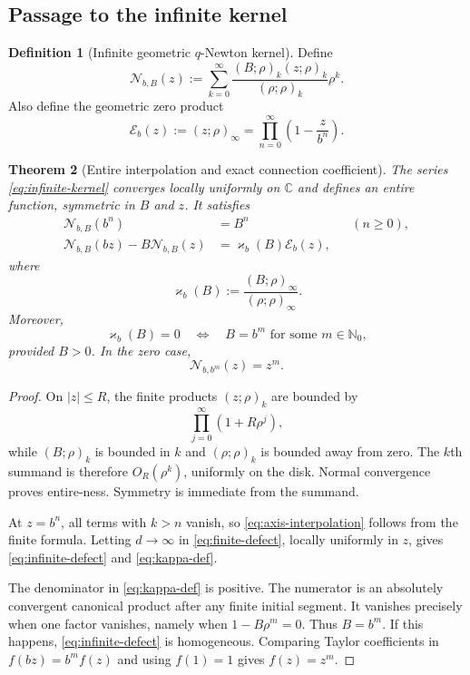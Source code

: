 \documentclass[11pt]{article}
\newtheorem{theorem}{Theorem}[section]
\theoremstyle{definition}
\newtheorem{definition}[theorem]{Definition}
\newcommand{\Nker}{\mathscr{N}}
\newcommand{\Eker}{\mathscr{E}}
\newcommand{\kk}{\varkappa}
\newcommand{\C}{\mathbb{C}}
\newcommand{\N}{\mathbb{N}}
\newcommand{\qpf}[3]{\left(#1;#2\right)_{#3}}
\newcommand{\qpi}[2]{\left(#1;#2\right)_{\!\infty}}
\begin{document}
\subsection{Passage to the infinite kernel}

\begin{definition}[Infinite geometric $q$-Newton kernel]\label{def:infinite-kernel}
Define
\begin{equation}\label{eq:infinite-kernel}
 \Nker_{b,B}(z)
 :=\sum_{k=0}^{\infty}
 \frac{\qpf{B}{\rho}{k}\qpf{z}{\rho}{k}}
      {\qpf{\rho}{\rho}{k}}\rho^k.
\end{equation}
Also define the geometric zero product
\begin{equation}\label{eq:E-product}
 \Eker_b(z):=\qpi{z}{\rho}
 =\prod_{n=0}^{\infty}\left(1-\frac{z}{b^n}\right).
\end{equation}
\end{definition}

\begin{theorem}[Entire interpolation and exact connection coefficient]\label{thm:infinite-kernel}
The series \eqref{eq:infinite-kernel} converges locally uniformly on $\C$ and defines an entire function, symmetric in $B$ and $z$.  It satisfies
\begin{align}
 \Nker_{b,B}(b^n)&=B^n &&(n\ge0),\label{eq:axis-interpolation}\\
 \Nker_{b,B}(bz)-B\Nker_{b,B}(z)
 &=\kk_b(B)\Eker_b(z),\label{eq:infinite-defect}
\end{align}
where
\begin{equation}\label{eq:kappa-def}
 \boxed{\displaystyle
 \kk_b(B):=\frac{\qpi{B}{\rho}}{\qpi{\rho}{\rho}}.}
\end{equation}
Moreover,
\begin{equation}\label{eq:kappa-zero}
 \kk_b(B)=0
 \quad\Longleftrightarrow\quad
 B=b^m\text{ for some }m\in\N_0,
\end{equation}
provided $B>0$.  In the zero case,
\[
 \Nker_{b,b^m}(z)=z^m.
\]
\end{theorem}

\begin{proof}
On $|z|\le R$, the finite products $\qpf{z}{\rho}{k}$ are bounded by
\[
 \prod_{j=0}^{\infty}(1+R\rho^j),
\]
while $\qpf{B}{\rho}{k}$ is bounded in $k$ and $\qpf{\rho}{\rho}{k}$ is bounded away from zero.  The $k$th summand is therefore $O_R(\rho^k)$, uniformly on the disk.  Normal convergence proves entire-ness.  Symmetry is immediate from the summand.

At $z=b^n$, all terms with $k>n$ vanish, so \eqref{eq:axis-interpolation} follows from the finite formula.  Letting $d\to\infty$ in \eqref{eq:finite-defect}, locally uniformly in $z$, gives \eqref{eq:infinite-defect} and \eqref{eq:kappa-def}.

The denominator in \eqref{eq:kappa-def} is positive.  The numerator is an absolutely convergent canonical product after any finite initial segment.  It vanishes precisely when one factor vanishes, namely when $1-B\rho^m=0$.  Thus $B=b^m$.  If this happens, \eqref{eq:infinite-defect} is homogeneous.  Comparing Taylor coefficients in $f(bz)=b^mf(z)$ and using $f(1)=1$ gives $f(z)=z^m$.
\end{proof}
\end{document}
